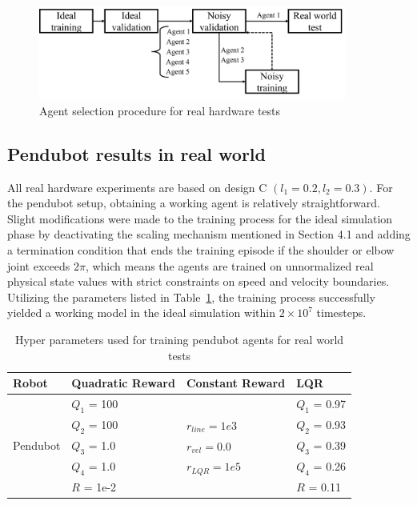 \begin{figure}[H]
    \centering
    \includegraphics[width=0.9\textwidth]{figures/hardware_result/agent_selection_procedure.png}%
    \caption{Agent selection procedure for real hardware tests}
    \label{fig:agent_selection}
\end{figure}

\subsection{Pendubot results in real world}
All real hardware experiments are based on design C \( (l_1 = 0.2, l_2 = 0.3) \). For the pendubot setup, obtaining a working agent is relatively straightforward. Slight modifications were made to the training process for the ideal simulation phase by deactivating the scaling mechanism mentioned in Section 4.1 and adding a termination condition that ends the training episode if the shoulder or elbow joint exceeds \( 2\pi \), which means the agents are trained on unnormalized real physical state values with strict constraints on speed and velocity boundaries. Utilizing the parameters listed in Table~\ref{tab:training_parameters_real_world_pendubot}, the training process successfully yielded a working model in the ideal simulation within \( 2 \times 10^7 \) timesteps.

\begin{table}[H]
  \centering
  \begin{tabular}{p{2cm} | p{3cm} | p{3cm} | p{3cm}}
  Robot & Quadratic Reward  & Constant Reward & LQR\\
  \hline
  \multirow{5}{*}{Pendubot} & \(Q_1\) = 100 &  & \(Q_1\) = 0.97\\
  & \(Q_2\) = 100  & \(r_{line}=1e3\) & \(Q_2\) = 0.93\\
  & \(Q_3\) = 1.0  & \(r_{vel}=0.0\) & \(Q_3\) = 0.39\\
  & \(Q_4\) = 1.0  & \(r_{LQR}=1e5\)& \(Q_4\) = 0.26\\
  & \(R\) = 1e-2  & & \(R\) = 0.11\\
  \end{tabular}
 \caption{Hyper parameters used for training pendubot agents for real world tests}
 \label{tab:training_parameters_real_world_pendubot}
\end{table}

